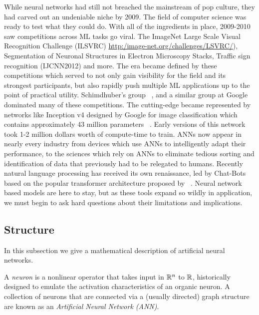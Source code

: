 While neural networks had still not breached the mainstream of pop
culture, they had carved out an undeniable niche by 2009. The
field of computer science was ready to test what they could
do. With all of the ingredients in place, 2009-2010 saw competitions
across ML tasks go viral. The ImageNet Large Scale Visual Recognition
Challenge (ILSVRC) \url{http:/image-net.org/challenges/LSVRC/}), Segmentation of Neuronal Structures in Electron
Microscopy Stacks, Traffic sign recognition (IJCNN2012) and more. The
era became defined by these competitions which served to not only gain 
visibility for the field and its strongest participants, but also
rapidly push multiple ML applications up to the point of practical
utility. Schimdhuber's group
~\citep{SCHMIDHUBER201585}, and a similar group at Google dominated
many of these competitions. The cutting-edge became represented by
networks like Inception v4 designed by Google for image classification
which contains approximately 43 million parameters
~\citep{szegedy2013}. Early versions of this network took 1-2 million
dollars worth of compute-time to train. ANNs now appear in nearly
every industry from devices which use ANNs to intelligently adapt
their performance, to the sciences which rely on ANNs to eliminate
tedious sorting and identification of data that previously had to be
relegated to humans. Recently natural language processing has received
its own renaissance, led by Chat-Bots based on the popular transformer
architecture proposed by  ~\citet{vaswani2017attention}. Neural
network based models are here to stay, but as these tools expand so
wildly in application, we must begin to ask hard questions about their
limitations and implications. 

\subsection{Structure}
In this subsection we give a mathematical description of artificial neural networks. 

A \emph{neuron} is a nonlinear operator that takes input in $\mathbb{R}^n$ to $\mathbb{R}$, historically designed to emulate the activation characteristics of an organic neuron. A collection of neurons that are connected via a (usually directed) graph structure are known as an \emph{Artificial Neural Network (ANN)}. 

